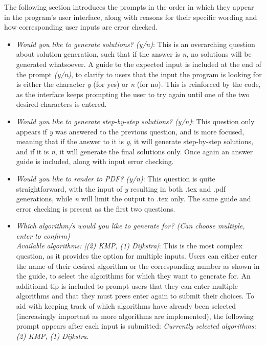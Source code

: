 \documentclass{l4proj}
\begin{document}
The following section introduces the prompts in the order in which they appear in the program's user interface, along with reasons for their specific wording and how corresponding user inputs are error checked.
\begin{itemize}
	\item
	\emph{Would you like to generate solutions? (y/n)}: This is an overarching question about solution generation, such that if the answer is \emph{n}, no solutions will be generated whatsoever. A guide to the expected input is included at the end of the prompt \emph{(y/n)}, to clarify to users that the input the program is looking for is either the character \emph{y} (for yes) or \emph{n} (for no). This is reinforced by the code, as the interface keeps prompting the user to try again until one of the two desired characters is entered.
	\item
	\emph{Would you like to generate step-by-step solutions? (y/n)}: This question only appears if \emph{y} was answered to the previous question, and is more focused, meaning that if the answer to it is \emph{y}, it will generate step-by-step solutions, and if it is \emph{n}, it will generate the final solutions only. Once again an answer guide is included, along with input error checking.
	\item
	\emph{Would you like to render to PDF? (y/n)}: This question is quite straightforward, with the input of \emph{y} resulting in both .tex and .pdf generations, while \emph{n} will limit the output to .tex only. The same guide and error checking is present as the first two questions.
	\item
	\emph{Which algorithm/s would you like to generate for? (Can choose multiple, enter to confirm) \\ Available algorithms: [(2) KMP, (1) Dijkstra]}: This is the most complex question, as it provides the option for multiple inputs. Users can either enter the name of their desired algorithm or the corresponding number as shown in the guide, to select the algorithms for which they want to generate for. An additional tip is included to prompt users that they can enter multiple algorithms and that they must press enter again to submit their choices. To aid with keeping track of which algorithms have already been selected (increasingly important as more algorithms are implemented), the following prompt appears after each input is submitted: \emph{Currently selected algorithms:(2) KMP, (1) Dijkstra}. 
\end{itemize}
\end{document}
